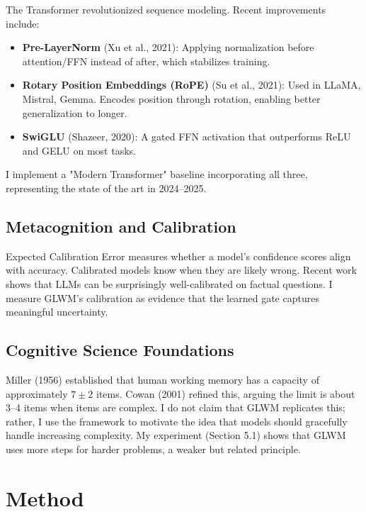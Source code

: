 \documentclass[11pt]{article}
\begin{document}
The Transformer\cite{Vaswani2017} revolutionized sequence modeling. Recent improvements include:
\begin{itemize}
    \item \textbf{Pre-LayerNorm} (Xu et al., 2021): Applying normalization before attention/FFN instead of after, which stabilizes training\cite{Xu2021}.
    \item \textbf{Rotary Position Embeddings (RoPE)} (Su et al., 2021): Used in LLaMA, Mistral, Gemma. Encodes position through rotation, enabling better generalization to longer\cite{Su2021}.
    \item \textbf{SwiGLU} (Shazeer, 2020): A gated FFN activation that outperforms ReLU and GELU on most tasks\cite{Shazeer2020}.
\end{itemize}

I implement a "Modern Transformer" baseline incorporating all three, representing the state of the art in 2024–2025.

\subsection{Metacognition and Calibration}

Expected Calibration Error\cite{Guo2017} measures whether a model's confidence scores align with accuracy. Calibrated models know when they are likely wrong. Recent work shows that LLMs can be surprisingly well-calibrated on factual questions\cite{Kadavath2022}. I measure GLWM's calibration as evidence that the learned gate captures meaningful uncertainty.

\subsection{Cognitive Science Foundations}

Miller (1956) established that human working memory\cite{Miller1956} has a capacity of approximately $7 \pm 2$ items. Cowan (2001)\cite{Cowan2001} refined this, arguing the limit is about 3–4 items when items are complex. I do not claim that GLWM replicates this; rather, I use the framework to motivate the idea that models should gracefully handle increasing complexity. My experiment (Section 5.1) shows that GLWM uses more steps for harder problems, a weaker but related principle.

\section{Method}
\end{document}
